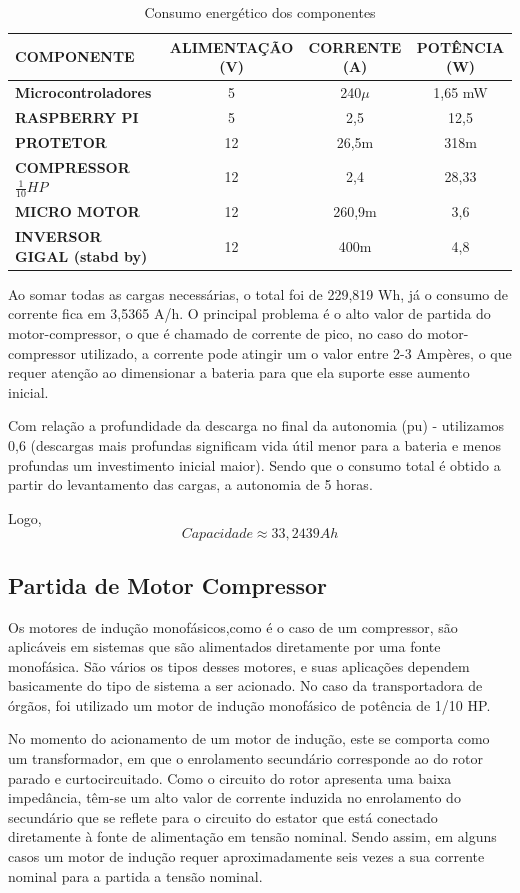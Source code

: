 \begin{table}[H]
\caption{Consumo energético dos componentes}
\begin{tabular}{|p{4 cm} |c |c |c |}
 \hline
   \textbf{COMPONENTE} &\textbf{ALIMENTAÇÃO (V)}  &\textbf{CORRENTE (A)} & \textbf{POTÊNCIA (W)} \\
   \hline
  \textbf{Microcontroladores} &5 & 240$\mu$& 1,65 mW \\
   \hline
   \textbf{RASPBERRY PI}&5 &2,5 & 12,5 \\
   \hline
  \textbf{PROTETOR } &12 &26,5m &318m \\
   \hline
  \textbf{COMPRESSOR $\frac{1}{10}HP$} &12 & 2,4& 28,33 \\
   \hline
  \textbf{MICRO MOTOR} &12 &260,9m &3,6  \\
   \hline
	\textbf{INVERSOR GIGAL (stabd by)} &12 &400m &4,8  \\
	\hline
\end{tabular}
\end{table}

Ao somar todas as cargas necessárias, o total foi de 229,819 Wh, já o consumo de corrente fica em 3,5365 A/h. O principal problema é o alto valor de partida do motor-compressor, o que é chamado de corrente de pico, no caso do motor-compressor utilizado, a corrente pode atingir um o valor entre 2-3 Ampères, o que requer atenção ao dimensionar a bateria para que ela suporte esse aumento inicial.


Com relação a profundidade da descarga no final da autonomia (pu) - utilizamos 0,6 (descargas mais profundas significam vida útil menor para a bateria e menos profundas um investimento inicial maior). Sendo que o consumo total é obtido a partir do levantamento das cargas, a autonomia de 5 horas.

Logo, 
$$
Capacidade \approx 33,2439 Ah
$$
\subsection{Partida de Motor Compressor}
Os motores de indução monofásicos,como é o caso de um compressor, são aplicáveis em sistemas que são alimentados diretamente por uma fonte monofásica. São vários os tipos desses motores, e suas aplicações dependem basicamente do tipo de sistema a ser acionado. No caso da transportadora de órgãos, foi utilizado um motor de indução monofásico de potência de 1/10 HP.

No momento do acionamento de um motor de indução, este se comporta como um transformador, em que o enrolamento secundário corresponde ao do rotor parado e curtocircuitado. Como o circuito do rotor apresenta uma baixa impedância, têm-se um alto valor de corrente induzida no enrolamento do secundário que se reflete para o circuito do estator que está conectado diretamente à fonte de alimentação em tensão nominal. Sendo assim, em alguns casos um motor de indução requer aproximadamente seis vezes a sua corrente nominal para a partida a tensão nominal.

